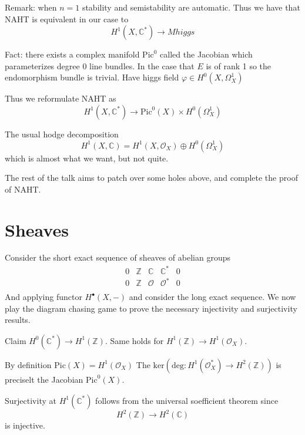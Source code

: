 Remark: when $n=1$ stability and semistability are automatic. 
Thus we have that NAHT is equivalent in our case to 
\begin{equation}
    H^1(X, \mathbb{C} ^*) \rightarrow Mhiggs
\end{equation}

Fact: there exists a complex manifold $\mathrm{Pic} ^0 $ called the Jacobian 
which parameterizes degree 0 line bundles.
In the case that $E$ is of rank 1 so the endomorphism bundle is trivial. 
Have higgs field $\varphi \in H^0 ( X , \Omega_X ^1 ) $ 

Thus we reformulate NAHT as 
\begin{equation}
    H^1(X, \mathbb{C} ^*) \rightarrow \mathrm{Pic}^0 (X) \times H^0 (\Omega_X ^1 ) 
\end{equation}

The usual hodge decomposition 
\begin{equation}
    H^1 ( X, \mathbb{C} ) = H^1 ( X, \mathcal{O} _X ) \oplus H^0 ( \Omega_X ^1 ) 
\end{equation}
which is almost what we want, but not quite. 

The rest of the talk aims to patch over some holes above, 
and complete the proof of NAHT.

\section{Sheaves} %

Consider the short exact sequence of sheaves of abelian groups 
\begin{align}
    0 & \mathbb{Z}  & \mathbb{C}  & \mathbb{C} ^* & 0 \\
    0 & \mathbb{Z}  & \mathcal{O}  & \mathcal{O}^* & 0 \\
\end{align}
And applying functor $H^ \bullet (X, - ) $ and consider the long exact sequence. 
We now play the diagram chasing game to prove the necessary injectivity and surjectivity results. 

Claim $ H^0 ( \mathbb{C} ^* ) \rightarrow  H^1 ( \mathbb{Z} ) $. 
Same holds for $ H^1 ( \mathbb{Z} ) \rightarrow  H^1( \mathcal{O} _X ) $.

By definition $ \mathrm{Pic} (X) = H^1 ( \mathcal{O} _X ) $
The $\mathrm{ker}( \mathrm{deg}: H^1 ( \mathcal{O}_X ^* ) \rightarrow H^2(\mathbb{Z} ) )$ is preciselt the Jacobian $\mathrm{Pic}^0 (X)$.

Surjectivity at $H^1( \mathbb{C} ^* ) $ follows from the universal soefficient theorem since 
\begin{equation}
    H^2 (\mathbb{Z} ) \rightarrow H^2 ( \mathbb{C} ) 
\end{equation}
is injective. 

